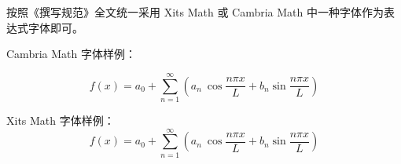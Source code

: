 按照《撰写规范》全文统一采用 Xits Math 或 Cambria Math 中一种字体作为表达式字体即可。

Cambria Math 字体样例：

\begin{equation}
  f(x)=a_0+ \sum_{n=1}^{\infty}   \left(  a_n\ \cos \frac{n\pi x}{L} +b_n  \sin⁡ \frac{n\pi x}{L}   \right)
\end{equation}

Xits Math 字体样例：
\begin{equation}
  f(x)=a_0+ \sum_{n=1}^{\infty}   \left(  a_n\ \cos \frac{n\pi x}{L} +b_n  \sin⁡ \frac{n\pi x}{L}   \right)
\end{equation}


